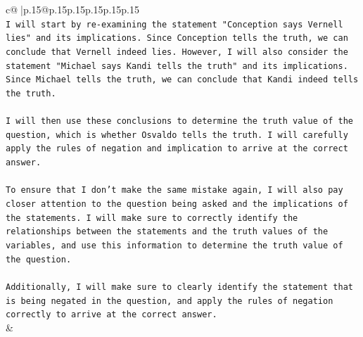 \documentclass{article}
\begin{document}
{\begin{supertabular}{c@{$\;$}|p{.15\linewidth}@{}p{.15\linewidth}p{.15\linewidth}p{.15\linewidth}p{.15\linewidth}p{.15\linewidth}}
{{{\\ 
\texttt{I will start by re{-}examining the statement "Conception says Vernell lies" and its implications. Since Conception tells the truth, we can conclude that Vernell indeed lies. However, I will also consider the statement "Michael says Kandi tells the truth" and its implications. Since Michael tells the truth, we can conclude that Kandi indeed tells the truth.} \\
\\ 
\texttt{I will then use these conclusions to determine the truth value of the question, which is whether Osvaldo tells the truth. I will carefully apply the rules of negation and implication to arrive at the correct answer.} \\
\\ 
\texttt{To ensure that I don't make the same mistake again, I will also pay closer attention to the question being asked and the implications of the statements. I will make sure to correctly identify the relationships between the statements and the truth values of the variables, and use this information to determine the truth value of the question.} \\
\\ 
\texttt{Additionally, I will make sure to clearly identify the statement that is being negated in the question, and apply the rules of negation correctly to arrive at the correct answer.} \\
            }
        }
    }
    & \\ \\

\end{supertabular}
}
\end{document}
